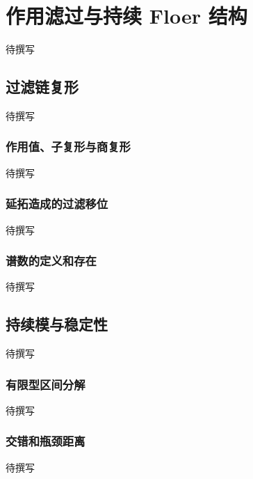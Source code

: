 
% 
% 
% 
% 
% 
% 

\chapter{作用滤过与持续 Floer 结构}
\label{g4:app:E}

待撰写

\section{过滤链复形}
\label{g4:sec:E01}
待撰写

\subsection{作用值、子复形与商复形}
\label{g4:subsec:E01:01}
待撰写

\subsection{延拓造成的过滤移位}
\label{g4:subsec:E01:02}
待撰写

\subsection{谱数的定义和存在}
\label{g4:subsec:E01:03}
待撰写

\section{持续模与稳定性}
\label{g4:sec:E02}
待撰写

\subsection{有限型区间分解}
\label{g4:subsec:E02:01}
待撰写

\subsection{交错和瓶颈距离}
\label{g4:subsec:E02:02}
待撰写


